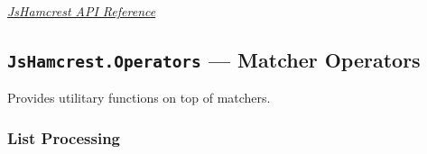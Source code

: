 \documentclass[letterpaper,10pt,english]{sphinxmanual}
\begin{document}


{\hyperref[modules/index:apiref]{\emph{JsHamcrest API Reference}}}




\subsection{\texttt{JsHamcrest.Operators} --- Matcher Operators}
\label{modules/operator::doc}\label{modules/operator:module-JsHamcrest.Operators}\label{modules/operator:jshamcrest-operators-matcher-operators}
Provides utilitary functions on top of matchers.


\subsubsection{List Processing}
\label{modules/operator:list-processing}
\end{document}
